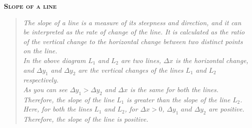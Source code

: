 \documentclass{article}
\begin{document}
\begin{center}
    \textsc{\Large\textbf{Slope of a line}}
\end{center}
    \begin{center}
    \end{center}
    \begin{quote}
        \textit{
            The slope of a line is a measure of its steepness and direction, and it can be interpreted as the rate of change of the line. It is calculated as the ratio of the vertical change to the horizontal change between two distinct points on the line.\\[2mm]
            In the above diagram $L_1$ and $L_2$ are two lines, $\Delta x$ is the horizontal change, and $\Delta y_1$ and $\Delta y_2$ are the vertical changes of the lines $L_1$ and $L_2$ respectively.\\[2mm]
            As you can see $\Delta y_1 > \Delta y_2$ and $\Delta x$ is the same for both the lines. Therefore, the slope of the line $L_1$ is greater than the slope of the line $L_2$.\\[2mm]
            Here, for both the lines $L_1$ and $L_2$, for $\Delta x > 0$, $\Delta y_1 \textit{ and } \Delta y_2$ are positive. Therefore, the slope of the line is positive.
        }
    \end{quote}
\end{document}

